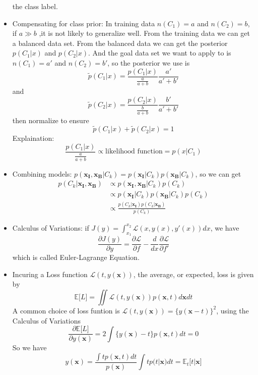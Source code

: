\documentclass[UTF8]{article}
\begin{document}
\begin{itemize}
        the class label.
        \item Compensating for class prior: In training data $n(C_1)=a$ and $n(C_2)=b$, if 
        $a\gg b$ ,it is not likely to generalize well. From the training data we can get a 
        balanced data set. From the balanced data we can get the posterior $p(C_1|x)$ and 
        $p(C_2|x)$. And the goal data set we want to apply to is $n(C_1)=a'$ and $n(C_2)=b'$, 
        so the posterior we use is \[\widetilde{p}(C_1|x)=\frac{p(C_1|x)}{\frac{a}{a+b}}
        \frac{a'}{a'+b'}\] and \[\widetilde{p}(C_2|x)=\frac{p(C_2|x)}{\frac{b}{a+b}}
        \frac{b'}{a'+b'}\] then normalize to ensure
         \[\widetilde{p}(C_1|x)+\widetilde{p}(C_2|x)=1\]
         Explaination: 
         \[\frac{p(C_1|x)}{\frac{a}{a+b}}\propto \text{likelihood function}=p(x|C_1)\]
         \item Combining models: $p(\bm{x_I},\bm{x_B}|C_k)=p(\bm{x_I}|C_k)p(\bm{x_B}|C_k)$,
        so we can get
        \begin{align*}
            p(C_k|\bm{x_I},\bm{x_B})&\propto p(\bm{x_I},\bm{x_B}|C_k)p(C_k)\\
            &\propto p(\bm{x_I}|C_k)p(\bm{x_B}|C_k)p(C_k)\\
            &\propto \frac{p(C_k|\bm{x_I})p(C_k|\bm{x_B})}{p(C_k)}
        \end{align*}
        \item Calculus of Variations: if $J(y)=\int_{x_1}^{x_2}\mathcal{L}(x,y(x),y'(x))dx$, 
        we have 
        \[
            \frac{\partial J(y)}{\partial y}=\frac{\partial\mathcal{L}}{\partial f}-\frac{d}{dx}
            \frac{\partial\mathcal{L}}{\partial f'}
            \]
        which is called Euler-Lagrange Equation.
        \item Incuring a Loss function $\mathcal{L}(t,y(\bm{x}))$, the average, or expected, 
        loss is given by
        \begin{equation}
            \label{equ:loss:expectation}
            \mathbb{E}\lbrack L\rbrack=\iint\mathcal{L}(t,y(\bm{x}))p(\bm{x},t)d\bm{x}dt
        \end{equation}
        A common choice of loss funtion is $\mathcal{L}(t,y(\bm{x}))=\{y(\bm{x}-t)\}^2$, 
        using the Calculus of Variations
        \[
            \frac{\partial\mathbb{E}\lbrack L\rbrack}{\partial y(\bm{x})}=
            2\int\{y(\bm{x})-t\}p(\bm{x},t)dt=0
            \]
        So we have
        \[
            y(\bm{x})=\frac{\int tp(\bm{x},t)dt}{p(\bm{x})}\int tp(t|\bm{x})dt=
            \mathbb{E}_t\lbrack t|\bm{x}\rbrack
\]
\end{itemize}
\end{document}
